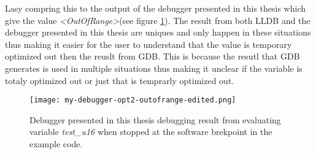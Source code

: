 Lasy compring this to the output of the debugger presented in this thesis which give the value \emph{<OutOfRange>}(see figure \ref{fig:mydebuggeroutofrange}).
The result from both \gls{LLDB} and the debugger presented in this thesis are uniques and only happen in these situations thus making it easier for the user to understand that the value is temporary optimized out then the reuslt from \gls{GDB}.
This is because the resutl that \gls{GDB} generates is used in multiple situations thus making it unclear if the variable is totaly optimized out or just that is temprarly optimized out.


\begin{figure}[h]
    \centering
    \texttt{[image: my-debugger-opt2-outofrange-edited.png]}
	\caption{Debugger presented in this thesis debugging result from evaluating variable \emph{test\_u16} when stopped at the software brekpoint in the example code.}
    \label{fig:mydebuggeroutofrange}
\end{figure}

